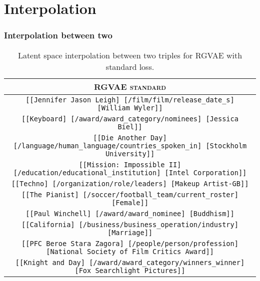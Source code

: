 \section{Interpolation}

\subsubsection{Interpolation between two}

\begin{table}[H]
    \centering
    \begin{tabular}{|c|}
    \hline
    \rowcolor[HTML]{EFEFEF} 
    \textsc{RGVAE standard}\\ \hline
    \texttt{[[Jennifer Jason Leigh] [/film/film/release\_date\_s] [William Wyler]]}\\
    \texttt{[[Keyboard] [/award/award\_category/nominees] [Jessica Biel]]}\\
    \texttt{[[Die Another Day] [/language/human\_language/countries\_spoken\_in] [Stockholm University]]}\\
    \texttt{[[Mission: Impossible II] [/education/educational\_institution] [Intel Corporation]]}\\
    \texttt{[[Techno] [/organization/role/leaders] [Makeup Artist-GB]]}\\
    \texttt{[[The Pianist] [/soccer/football\_team/current\_roster] [Female]]}\\
    \texttt{[[Paul Winchell] [/award/award\_nominee] [Buddhism]]}\\
    \texttt{[[California] [/business/business\_operation/industry] [Marriage]]}\\
    \texttt{[[PFC Beroe Stara Zagora] [/people/person/profession] [National Society of Film Critics Award]]}\\
    \texttt{[[Knight and Day] [/award/award\_category/winners\_winner] [Fox Searchlight Pictures]]}\\    
    \hline
    \end{tabular}
\caption{Latent space interpolation between two triples for RGVAE with standard loss.}
\label{annexA:ipbtw2NoPerm}
\end{table}


